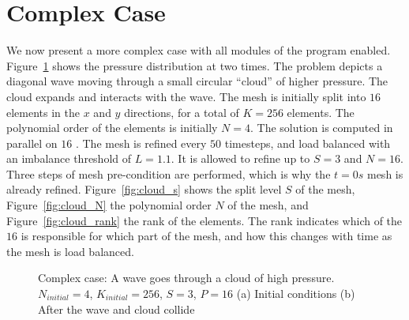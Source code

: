 \section{Complex Case}\label{section:results:complex_application}

We now present a more complex case with all modules of the program enabled. Figure~\ref{fig:cloud_p}
shows the pressure distribution at two times. The problem depicts a diagonal wave moving through a
small circular ``cloud'' of higher pressure. The cloud expands and interacts with the wave. The mesh
is initially split into \(16\) elements in the \(x\) and \(y\) directions, for a total of \(K =
256\) elements. The polynomial order of the elements is initially \(N = 4\). The solution is
computed in parallel on \(16\) . The mesh is refined every \(50\) timesteps, and
load balanced with an imbalance threshold of \(L = 1.1\). It is allowed to refine up to \(S = 3\)
and \(N = 16\). Three steps of mesh pre-condition are performed, which is why the \(t = 0 s\)
mesh is already refined. Figure~\ref{fig:cloud_s} shows the split level \(S\) of the mesh,
Figure~\ref{fig:cloud_N} the polynomial order \(N\) of the mesh, and Figure~\ref{fig:cloud_rank} the
rank of the elements. The rank indicates which of the \(16\)  is responsible for
which part of the mesh, and how this changes with time as the mesh is load balanced.

\begin{figure}[H]
	\centering
	\hfill
	\caption{Complex case: A wave goes through a cloud of high pressure. \(N_{initial} = 4\), \(K_{initial} = 256\), \(S = 3\), \(P = 16\) (a) Initial conditions (b) After the wave and cloud collide}\label{fig:cloud_p}
\end{figure}

